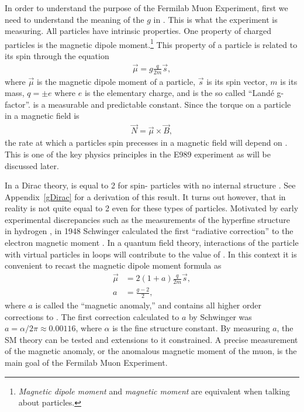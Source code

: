 In order to understand the purpose of the Fermilab Muon \gmtwo Experiment, first we need to understand the meaning of the $g$ in \gmtwo. This is what the experiment is measuring. All particles have intrinsic properties. One property of charged particles is the magnetic dipole moment.\footnote{\textit{Magnetic dipole moment} and \textit{magnetic moment} are equivalent when talking about particles.} This property of a particle is related to its spin through the equation
		\begin{align}
            \vec{\mu} = g \frac{q}{2m} \vec{s},
        \label{eq:magneticmoment}
		\end{align}
where $\vec{\mu}$ is the magnetic dipole moment of a particle, $\vec{s}$ is its spin vector, $m$ is its mass, $q = \pm e$ where $e$ is the elementary charge, and \g is the so called ``Land\'{e} g-factor''. \g is a measurable and predictable constant. Since the torque on a particle in a magnetic field is 
		\begin{align}
            \vec{N} = \vec{\mu} \times \vec{B},
        \label{eq:torque}
		\end{align}
the rate at which a particles spin precesses in a magnetic field will depend on \g. This is one of the key physics principles in the E989 experiment as will be discussed later.

In a Dirac theory, \g is equal to 2 for spin-\textonehalf\xspace particles with no internal structure \cite{Dirac}. See Appendix~\ref{gDirac} for a derivation of this result. It turns out however, that in reality \g is not quite equal to 2 even for these types of particles. Motivated by early experimental discrepancies such as the measurements of the hyperfine structure in hydrogen \cite{EarlyHyperfine1}, in 1948 Schwinger calculated the first ``radiative correction'' to the electron magnetic moment \cite{Schwinger}. In a quantum field theory, interactions of the particle with virtual particles in loops will contribute to the value of \g. In this context it is convenient to recast the magnetic dipole moment formula as 
		\begin{equation}
		\begin{aligned}
            \vec{\mu} &= 2(1+a) \frac{q}{2m} \vec{s}, \\
            a &= \frac{g-2}{2},
        \label{eq:anamoly}
		\end{aligned}
		\end{equation}
where $a$ is called the ``magnetic anomaly,'' and contains all higher order corrections to \g. The first correction calculated to $a$ by Schwinger was $a = \alpha/2\pi \approx 0.00116$, where $\alpha$ is the fine structure constant. By measuring $a$, the SM theory can be tested and extensions to it constrained. A precise measurement of the magnetic anomaly, or the anomalous magnetic moment of the muon, is the main goal of the Fermilab Muon \gmtwo Experiment.


